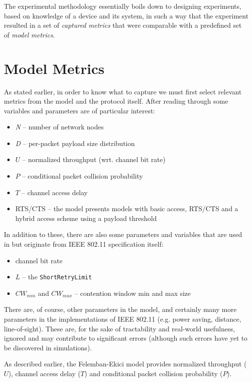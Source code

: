 The experimental methodology essentially boils down to designing experiments,
based on knowledge of a device and its system, in such a way that the
experiment resulted in a set of \emph{captured metrics} that were comparable
with a predefined set of \emph{model metrics}.

\section{Model Metrics}

As stated earlier, in order to know what to capture we must first select
relevant metrics from the model and the protocol itself. After reading through
\cite{felemban} some variables and parameters are of particular interest:

\begin{itemize}
	\item \emph{N} -- number of network nodes
	\item \emph{D} -- per-packet payload size distribution
  \item $U$ -- normalized throughput (wrt. channel bit rate)
  \item $P$ -- conditional packet collision probability
  \item $T$ -- channel access delay
	\item RTS/CTS -- the model presents models with basic access, RTS/CTS and a
	hybrid access scheme using a payload threshold
\end{itemize}

In addition to these, there are also some parameters and variables that are
used in \cite{felemban} but originate from IEEE 802.11 specification itself:

\begin{itemize}
    \item channel bit rate
    \item $L$ -- the \texttt{ShortRetryLimit}
    \item $CW_{min}$ and $CW_{max}$ -- contention window min and max size
\end{itemize}


There are, of course, other parameters in the model, and certainly many more
parameters in the implementations of IEEE 802.11 (e.g. power saving, distance,
line-of-sight). These are, for the sake of tractability and real-world
usefulness, ignored and may contribute to significant errors (although such
errors have yet to be discovered in simulations).

As described earlier, the Felemban-Ekici model provides normalized throughput
($U$), channel access delay ($T$) and conditional packet collision probability
($P$).

